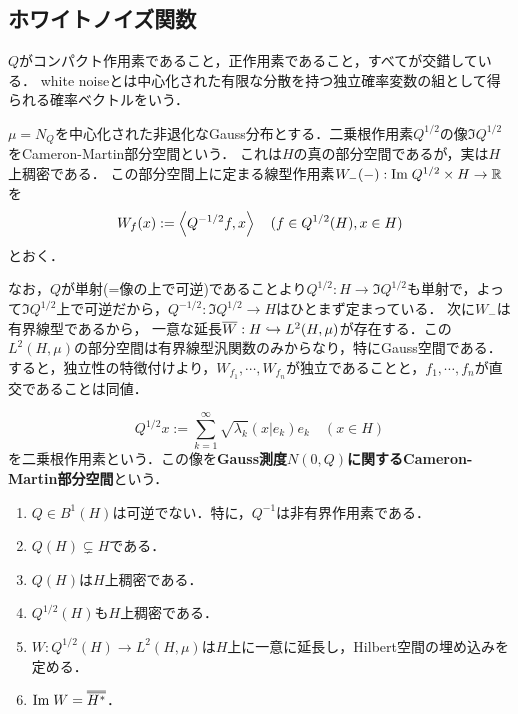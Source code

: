 \documentclass[uplatex,dvipdfmx]{jsreport}
\begin{document}
\subsection{ホワイトノイズ関数}

\begin{tcolorbox}[colframe=ForestGreen, colback=ForestGreen!10!white,breakable,colbacktitle=ForestGreen!40!white,coltitle=black,fonttitle=\bfseries\sffamily,
title=]
    $Q$がコンパクト作用素であること，正作用素であること，すべてが交錯している．
    white noiseとは中心化された有限な分散を持つ独立確率変数の組として得られる確率ベクトルをいう．
\end{tcolorbox}

\begin{notation}
    $\mu=N_Q$を中心化された非退化なGauss分布とする．二乗根作用素$Q^{1/2}$の像$\Im Q^{1/2}$をCameron-Martin部分空間という．
    これは$H$の真の部分空間であるが，実は$H$上稠密である．
    この部分空間上に定まる線型作用素$W_-(-):\mathrm{Im}\; Q^{1/2}\times H\to\mathbb{R}$を
    \[W_f(x):=\left\langle Q^{-1/2}f,x\right\rangle\quad(f\in Q^{1/2}(H),x\in H)\]
    とおく．

    なお，$Q$が単射(=像の上で可逆)であることより$Q^{1/2}:H\to\Im Q^{1/2}$も単射で，よって$\Im Q^{1/2}$上で可逆だから，$Q^{-1/2}:\Im Q^{1/2}\to H$はひとまず定まっている．
    次に$W_-$は有界線型であるから，
    一意な延長$\overline{W}:H\hookrightarrow L^2(H,\mu)$が存在する．この$L^2(H,\mu)$の部分空間は有界線型汎関数のみからなり，特にGauss空間である．
    すると，独立性の特徴付けより，$W_{f_1},\cdots,W_{f_n}$が独立であることと，$f_1,\cdots,f_n$が直交であることは同値．
\end{notation}

\begin{definition}
    \[Q^{1/2}x:=\sum^\infty_{k=1}\sqrt{\lambda_k}(x|e_k)e_k\quad(x\in H)\]
    を二乗根作用素という．この像を\textbf{Gauss測度$N(0,Q)$に関するCameron-Martin部分空間}という．
\end{definition}

\begin{lemma}\mbox{}
    \begin{enumerate}
        \item $Q\in B^1(H)$は可逆でない．特に，$Q^{-1}$は非有界作用素である．
        \item $Q(H)\subsetneq H$である．
        \item $Q(H)$は$H$上稠密である．
        \item $Q^{1/2}(H)$も$H$上稠密である．
        \item $W:Q^{1/2}(H)\to L^2(H,\mu)$は$H$上に一意に延長し，Hilbert空間の埋め込みを定める．
        \item $\Im W=\oo{H^*}$．
    \end{enumerate}
\end{lemma}
\end{document}
